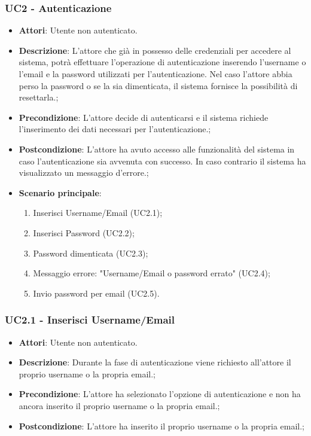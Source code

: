 \subsubsection{UC2 - Autenticazione} 
\label{sssec:UC2} 
\begin{itemize} 
\item \textbf{Attori}: Utente non autenticato.
\item \textbf{Descrizione}: L'attore che già in possesso delle credenziali per accedere al sistema, potrà effettuare l'operazione di autenticazione inserendo l'username o l'email e la password utilizzati per l'autenticazione. Nel caso l’attore abbia perso la password o se la sia dimenticata, il sistema fornisce la possibilità di resettarla.;
\item \textbf{Precondizione}: L'attore decide di autenticarsi e il sistema richiede l'inserimento dei dati necessari per l'autenticazione.;
\item \textbf{Postcondizione}: L'attore ha avuto accesso alle funzionalità del sistema in caso l'autenticazione sia avvenuta con successo. In caso contrario il sistema ha visualizzato un messaggio d'errore.;
\item \textbf{Scenario principale}: \begin{enumerate}\item Inserisci Username/Email (UC2.1);\item Inserisci Password (UC2.2);\item Password dimenticata (UC2.3);\item Messaggio errore: "Username/Email o password errato" (UC2.4);\item Invio password per email (UC2.5). 
 \end{enumerate}
\end{itemize} 
\subsubsection{UC2.1 - Inserisci Username/Email} 
\label{sssec:UC2.1} 
\begin{itemize} 
\item \textbf{Attori}: Utente non autenticato.
\item \textbf{Descrizione}: Durante la fase di autenticazione viene richiesto all'attore il proprio username o la propria email.;
\item \textbf{Precondizione}: L'attore ha selezionato l'opzione di autenticazione e non ha ancora inserito il proprio username o la propria email.;
\item \textbf{Postcondizione}: L'attore ha inserito il proprio username o la propria email.;
\end{itemize} 
